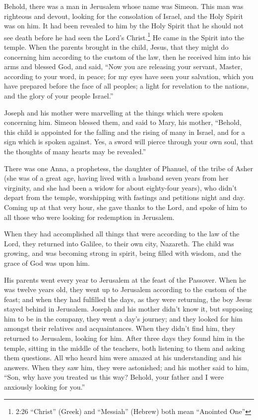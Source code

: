  Behold, there was a man in Jerusalem whose name was
Simeon. This man was righteous and devout, looking for the consolation
of Israel, and the Holy Spirit was on him.  It had been
revealed to him by the Holy Spirit that he should not see death before
he had seen the Lord's Christ.\footnote{2:26 ``Christ'' (Greek) and
  ``Messiah'' (Hebrew) both mean ``Anointed One''}  He came
in the Spirit into the temple. When the parents brought in the child,
Jesus, that they might do concerning him according to the custom of the
law,  then he received him into his arms and blessed God,
and said,  ``Now you are releasing your servant, Master,
according to your word, in peace;  for my eyes have seen
your salvation,  which you have prepared before the face of
all peoples;  a light for revelation to the nations, and
the glory of your people Israel.''

 Joseph and his mother were marvelling at the things which
were spoken concerning him.  Simeon blessed them, and said
to Mary, his mother, ``Behold, this child is appointed for the falling
and the rising of many in Israel, and for a sign which is spoken
against.  Yes, a sword will pierce through your own soul,
that the thoughts of many hearts may be revealed.''

 There was one Anna, a prophetess, the daughter of Phanuel,
of the tribe of Asher (she was of a great age, having lived with a
husband seven years from her virginity,  and she had been a
widow for about eighty-four years), who didn't depart from the temple,
worshipping with fastings and petitions night and day. 
Coming up at that very hour, she gave thanks to the Lord, and spoke of
him to all those who were looking for redemption in Jerusalem.

 When they had accomplished all things that were according
to the law of the Lord, they returned into Galilee, to their own city,
Nazareth.  The child was growing, and was becoming strong
in spirit, being filled with wisdom, and the grace of God was upon him.

 His parents went every year to Jerusalem at the feast of
the Passover.  When he was twelve years old, they went up
to Jerusalem according to the custom of the feast;  and
when they had fulfilled the days, as they were returning, the boy Jesus
stayed behind in Jerusalem. Joseph and his mother didn't know it,
 but supposing him to be in the company, they went a day's
journey; and they looked for him amongst their relatives and
acquaintances.  When they didn't find him, they returned to
Jerusalem, looking for him.  After three days they found
him in the temple, sitting in the middle of the teachers, both listening
to them and asking them questions.  All who heard him were
amazed at his understanding and his answers.  When they saw
him, they were astonished; and his mother said to him, ``Son, why have
you treated us this way? Behold, your father and I were anxiously
looking for you.''

